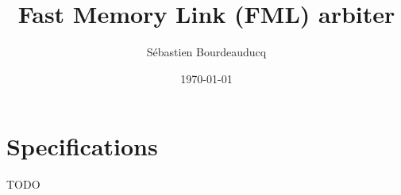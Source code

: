 \documentclass[a4paper,11pt]{article}
\title{Fast Memory Link (FML) arbiter}
\author{S\'ebastien Bourdeauducq}
\date{\today}
\begin{document}
\maketitle{}
\section{Specifications}
TODO
\end{document}
